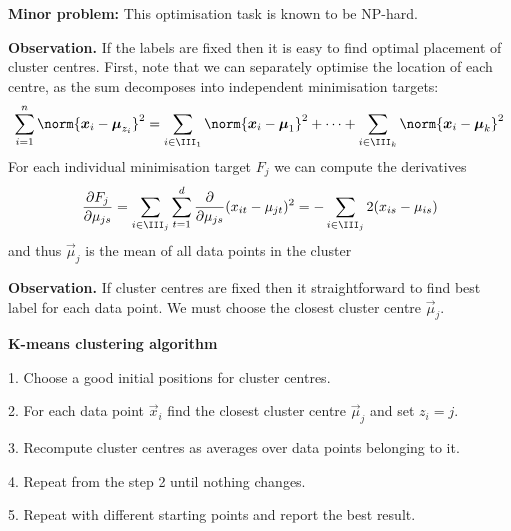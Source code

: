 \documentclass[landscape,footrule]{foils}
\begin{document}
\textbf{Minor problem:} This optimisation task is known to be NP-hard.



\textbf{Observation.} If the labels are fixed then it is easy to find optimal placement of cluster centres. First, note that we can separately optimise the location of each centre, as the sum decomposes into independent minimisation targets:  
\begin{align*}
\sum_{i=1}^n\norm{\vec{x}_i-\vec{\mu}_{z_i}}^2=\sum_{i\in\III_1}\norm{\vec{x}_i-\vec{\mu}_{1}}^2+\cdots+\sum_{i\in\III_k}\norm{\vec{x}_i-\vec{\mu}_{k}}^2
\end{align*}
For each individual minimisation target $F_j$ we can compute the derivatives
\begin{align*}
\frac{\partial F_j}{\partial \mu_{js}}=\sum_{i\in\III_j}\sum_{t=1}^d\frac{\partial}{\partial \mu_{js}}(x_{it}-\mu_{jt})^2=
-\sum_{i\in\III_j}2(x_{is}-\mu_{is})
\end{align*}
and thus $\vec{\mu}_j$ is the mean of all data points in the cluster  



\textbf{Observation.} If cluster centres are fixed then it straightforward to find best label for each data point. We must choose the closest cluster centre $\vec{\mu}_j$.
\vspace*{2cm}


\textbf{K-means clustering algorithm}
\begin{triangles}
\item[1.] Choose a good initial positions for cluster centres.
\item[2.] For each data point $\vec{x}_i$ find the closest cluster centre $\vec{\mu}_j$ and set $z_i=j$.
\item[3.] Recompute cluster centres as averages over data points belonging to it.
\item[4.] Repeat from the step 2 until nothing changes.
\item[5.] Repeat with different starting points and report the best result.   
\end{triangles}

\end{document}
